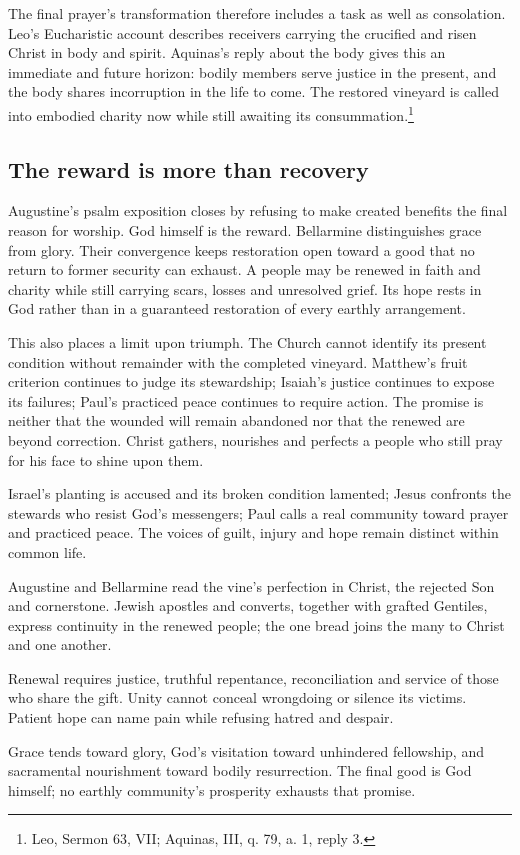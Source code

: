 The final prayer's transformation therefore includes a task as well as consolation. Leo's Eucharistic account describes receivers carrying the crucified and risen Christ in body and spirit. Aquinas's reply about the body gives this an immediate and future horizon: bodily members serve justice in the present, and the body shares incorruption in the life to come. The restored vineyard is called into embodied charity now while still awaiting its consummation.\footnote{Leo, Sermon 63, VII; Aquinas, III, q. 79, a. 1, reply 3.}

\subsection{The reward is more than recovery}
Augustine's psalm exposition closes by refusing to make created benefits the final reason for worship. God himself is the reward. Bellarmine distinguishes grace from glory. Their convergence keeps restoration open toward a good that no return to former security can exhaust. A people may be renewed in faith and charity while still carrying scars, losses and unresolved grief. Its hope rests in God rather than in a guaranteed restoration of every earthly arrangement.

This also places a limit upon triumph. The Church cannot identify its present condition without remainder with the completed vineyard. Matthew's fruit criterion continues to judge its stewardship; Isaiah's justice continues to expose its failures; Paul's practiced peace continues to require action. The promise is neither that the wounded will remain abandoned nor that the renewed are beyond correction. Christ gathers, nourishes and perfects a people who still pray for his face to shine upon them.

\begin{fourSenses}
\item[Literal.] Israel's planting is accused and its broken condition lamented; Jesus confronts the stewards who resist God's messengers; Paul calls a real community toward prayer and practiced peace. The voices of guilt, injury and hope remain distinct within common life.
\item[Allegorical.] Augustine and Bellarmine read the vine's perfection in Christ, the rejected Son and cornerstone. Jewish apostles and converts, together with grafted Gentiles, express continuity in the renewed people; the one bread joins the many to Christ and one another.
\item[Moral.] Renewal requires justice, truthful repentance, reconciliation and service of those who share the gift. Unity cannot conceal wrongdoing or silence its victims. Patient hope can name pain while refusing hatred and despair.
\item[Anagogical.] Grace tends toward glory, God's visitation toward unhindered fellowship, and sacramental nourishment toward bodily resurrection. The final good is God himself; no earthly community's prosperity exhausts that promise.
\end{fourSenses}
